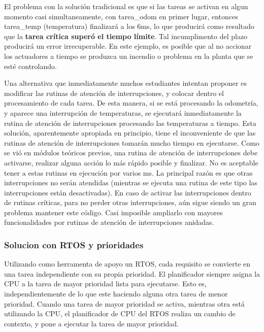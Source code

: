 \documentclass[output=paper, 
colorlinks,
citecolor=brown,
newtxmath
]{langscibook}
\begin{document}
El problema con la solución tradicional es que si las tareas se activan en algun momento casi simultaneamente,  con tarea\_odom en primer lugar, entonces 
tarea\_temp (temperatura) finalizará a los 6ms, lo que producirá como resultado que la \textbf{tarea crítica superó el tiempo límite}.
Tal incumplimento del plazo producirá un error irrecuperable. En este ejemplo, es posible que al no accionar los actuadores a tiempo se produzca un incendio o problema en la planta que se esté controlando.



Una alternativa que inmediatamente muchos estudiantes intentan proponer es modificar las rutinas de atención de interrupciones, y colocar dentro el procesamiento de cada tarea. 
De esta manera, si se está procesando la odometría, y aparece una interrupción de temperaturas, se ejecutará inmediatamente la rutina de atención de interrupciones procesando las temperaturas a tiempo.
Esta solución, aparentemente apropiada en principio, tiene el inconveniente de
que las rutinas de atención de interrupciones tomarán mucho tiempo en 
ejecutarse. 
Como se vió en módulos teóricos previos, una rutina de atención de interrupciones debe activarse, realizar alguna acción lo más rápido posible y finalizar. 
No es aceptable tener a estas rutinas en ejecución por varios ms. 
La principal razón es que otras interrupciones no serán atendidas (mientras se ejecuta una rutina de este tipo las interrupciones están desactivadas). En caso de activar las interrupciones dentro de rutinas críticas, para no perder otras interrupciones, aún sigue siendo un gran problema mantener este código. Casi imposible ampliarlo con mayores funcionalidades por rutinas de atención de interrupciones anidadas.



\subsubsection{Solucion con RTOS y prioridades}

Utilizando como herramenta de apoyo un RTOS, cada requisito se convierte en una tarea independiente con su propia prioridad. El planificador siempre asigna la CPU a la tarea de mayor prioridad lista para ejecutarse. 
Esto es, independientemente de lo que este haciendo alguna otra tarea de menor prioridad. 
Cuando una tarea de mayor prioridad se activa, mientras otra está utilizando
la CPU, el planificador de CPU del RTOS realiza un cambio de contexto,
y pone a ejecutar la tarea de mayor prioridad.
\end{document}
